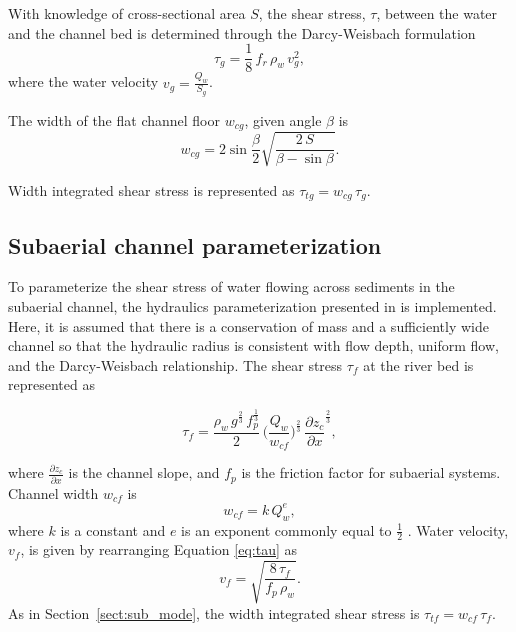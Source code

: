 \documentclass[11pt]{article}
\begin{document}
With knowledge of cross-sectional area $S$, the shear stress, $\tau$, between the water and the channel bed is determined through the Darcy-Weisbach formulation
\begin{equation}
  \label{eq:tau}
  \tau_g=\frac{1}{8}\,f_r\,\rho_w\,v_g^2,
\end{equation}
% 
where  the water velocity $v_g = \frac{Q_w}{S_g}$.

The width of the flat channel floor $w_{cg}$, given angle $\beta$ is 
\begin{equation}
  \label{eq:dh2wc}
  w_{cg} = 2  \sin \frac{\beta}{2} \sqrt{\frac{2\, S}{\beta -\sin \beta}}.
\end{equation}

Width integrated shear stress is represented as $\tau_{tg}=w_{cg}\,\tau_g $.

\subsection{Subaerial channel  parameterization}
\label{sect:fluv}

To parameterize the shear stress of water flowing across sediments in the subaerial channel,  the hydraulics parameterization presented in \citet{tucker1997} is implemented.
Here, it is assumed that there is a conservation of mass and a sufficiently wide channel so that the hydraulic radius is consistent with flow depth, uniform flow, and the Darcy-Weisbach relationship.
The shear stress $\tau_f$ at the river bed is represented as
\begin{linenomath*}
  \begin{equation}
    \label{eq:DW_tau}
    \tau_f=\frac{\rho_w\,g^{\frac{2}{3}}\,f_p^{\frac{1}{3}}}{2}\, \Big(\frac{Q_w}{w_{cf}} \Big)^{\frac{2}{3}} \,\frac{\partial z_c}{\partial x}^{\frac{2}{3}},
  \end{equation}
\end{linenomath*}
where $\frac{\partial z_c}{\partial x}$ is the channel slope, and $f_p$ is the friction factor for subaerial systems.
Channel width $w_{cf}$ is 
\begin{equation}
  \label{eq:wcf}
  w_{cf} = k \, Q_w^e,
\end{equation}
% 
where $k$ is a constant and $e$ is an exponent commonly equal to $\frac{1}{2}$ \citep{leopold1953}.
Water velocity, $v_f$, is given by rearranging Equation \ref{eq:tau} as
\begin{equation}
  \label{eq:vf}
  v_f = \sqrt{\frac{8\,\tau_f}{f_p\,\rho_w}}.
\end{equation}
% 
As in Section~\ref{sect:sub_mode}, the width integrated shear stress is $\tau_{tf}=w_{cf}\,\tau_f$.
\end{document}
